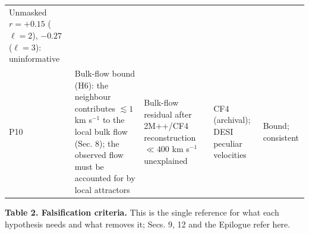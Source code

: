 \documentclass[
]{article}
\begin{document}
\begin{longtable}[]{@{}lllll@{}}
\begin{minipage}[t]{0.19\columnwidth}
Unmasked \(r = +0.15\) (\(\ell=2\)), \(-0.27\) (\(\ell=3\)):
uninformative\strut
\end{minipage}\tabularnewline
\begin{minipage}[t]{0.11\columnwidth}\raggedright
P10\strut
\end{minipage} & \begin{minipage}[t]{0.19\columnwidth}\raggedright
Bulk-flow bound (H6): the neighbour contributes \(\lesssim 1\) km
s\(^{-1}\) to the local bulk flow (Sec. 8); the observed flow must be
accounted for by local attractors\strut
\end{minipage} & \begin{minipage}[t]{0.19\columnwidth}\raggedright
Bulk-flow residual after 2M++/CF4 reconstruction \(\ll 400\) km
s\(^{-1}\) unexplained\strut
\end{minipage} & \begin{minipage}[t]{0.19\columnwidth}\raggedright
CF4 (archival); DESI peculiar velocities\strut
\end{minipage} & \begin{minipage}[t]{0.19\columnwidth}\raggedright
Bound; consistent\strut
\end{minipage}\tabularnewline
\bottomrule
\end{longtable}

\textbf{Table 2. Falsification criteria.} This is the single reference
for what each hypothesis needs and what removes it; Secs. 9, 12 and the
Epilogue refer here.
\end{document}
